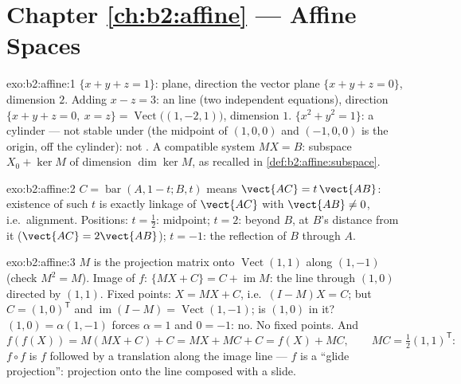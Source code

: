 \section*{Chapter \ref{ch:b2:affine} --- Affine Spaces}

\begin{solution}{exo:b2:affine:1}
$\{x + y + z = 1\}$:  plane, direction the vector plane $\{x
+ y + z = 0\}$, dimension $2$. Adding $x - z = 3$: an  line
(two independent equations), direction $\{x + y + z = 0,\ x = z\}
= \operatorname{Vect}\bigl((1, -2, 1)\bigr)$, dimension $1$. $\{x^2
+ y^2 = 1\}$: a cylinder --- not stable under  (the
midpoint of $(1,0,0)$ and $(-1,0,0)$ is the origin, off the
cylinder): not . A compatible system $MX = B$: 
subspace $X_0 + \ker M$ of dimension $\dim\ker M$, as recalled in
\cref{def:b2:affine:subspace}.
\end{solution}

\begin{solution}{exo:b2:affine:2}
$C = \operatorname{bar}(A, 1-t; B, t)$ means $\vect{AC} =
t\,\vect{AB}$: existence of such $t$ is exactly linkage of
$\vect{AC}$ with $\vect{AB} \neq 0$, i.e.\ alignment. Positions: $t
= \frac12$: midpoint; $t = 2$: beyond $B$, at $B$'s distance from
it ($\vect{AC} = 2\vect{AB}$); $t = -1$: the reflection of $B$
through $A$.
\end{solution}

\begin{solution}{exo:b2:affine:3}
$M$ is the projection matrix onto $\operatorname{Vect}(1,1)$ along
$(1,-1)$ (check $M^2 = M$). Image of $f$: $\{MX + C\} = C +
\operatorname{im} M$: the  line through $(1,0)$ directed by
$(1,1)$. Fixed points: $X = MX + C$, i.e.\ $(I - M)X = C$; but $C =
(1, 0)^{\mathsf T}$ and $\operatorname{im}(I - M) =
\operatorname{Vect}(1,-1)$; is $(1,0)$ in it? $(1, 0) =
\alpha(1,-1)$ forces $\alpha = 1$ and $0 = -1$: no. No fixed
points. And
\[
f(f(X)) = M(MX + C) + C = MX + MC + C = f(X) + MC,
\qquad MC = \tfrac12(1,1)^{\mathsf T} :
\]
$f\circ f$ is $f$ followed by a translation along the image line
--- $f$ is a ``glide projection'': projection onto the line
composed with a slide.
\end{solution}

